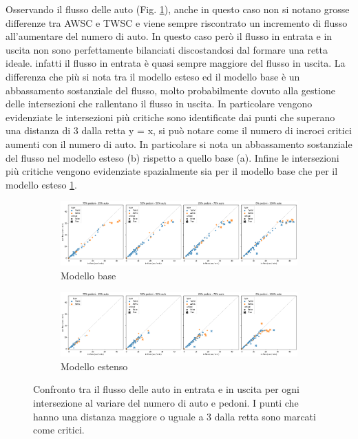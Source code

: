 Osservando il flusso delle auto (Fig. \ref{fig:analisi-comparison-in-out-flow-car}), anche in questo caso
non si notano grosse differenze tra AWSC e TWSC e viene sempre riscontrato un incremento di flusso all'aumentare del numero di auto.
In questo caso però il flusso in entrata e in uscita non sono perfettamente bilanciati discostandosi dal formare una retta ideale.
infatti il flusso in entrata è quasi sempre maggiore del flusso in uscita.
La differenza che più si nota tra il modello esteso ed il modello base è un abbassamento sostanziale del flusso,
molto probabilmente dovuto alla gestione delle intersezioni che rallentano il flusso in uscita.
In particolare vengono evidenziate le intersezioni più critiche sono identificate dai punti che superano una distanza di 3 dalla retta y = x,
si può notare come il numero di incroci critici aumenti con il numero di auto.
In particolare si nota un abbassamento sostanziale del flusso nel modello esteso (b)
rispetto a quello base (a).
Infine le intersezioni più critiche vengono evidenziate spazialmente sia per il modello base 
che per il modello esteso \ref{fig:analisi-comparison-in-out-flow-car}.

\begin{figure}[ht]
    \centering
    \begin{subfigure}{0.9\textwidth}
        \centering
        \includegraphics[width=\textwidth]{images/analisi/comparison-base-in-out-flow-car.png}
        \caption{Modello base}
    \end{subfigure}
    \hfill
    \begin{subfigure}{0.9\textwidth}
        \centering
        \includegraphics[width=\textwidth]{images/analisi/comparison-new-in-out-flow-car.png}
        \caption{Modello estenso}
    \end{subfigure}
    \caption{
        Confronto tra il flusso delle auto in entrata e in uscita per ogni intersezione al variare del numero di auto e pedoni.
        I punti che hanno una distanza maggiore o uguale a 3 dalla retta sono marcati come critici.
    }
    \label{fig:analisi-comparison-in-out-flow-car}
\end{figure}



